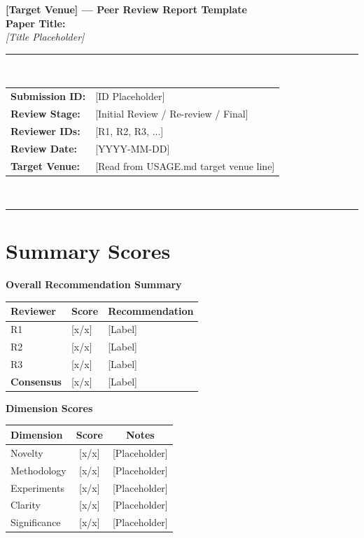 \documentclass[11pt,a4paper]{article}
\newenvironment{scorebox}[1]{%
  \begin{mdframed}[backgroundcolor=lightgray,linecolor=borderblue,linewidth=1.2pt,
                   innertopmargin=6pt,innerbottommargin=6pt,
                   innerleftmargin=10pt,innerrightmargin=10pt]
  \textbf{\color{sectionblue}#1}\\[4pt]
}{%
  \end{mdframed}
}
\begin{document}
\begin{center}
  {\LARGE\bfseries [Target Venue] --- Peer Review Report Template}\\[6pt]
  {\large\bfseries Paper Title:}\\[3pt]
  {\large\itshape [Title Placeholder]}\\[10pt]
  \rule{\linewidth}{1pt}\\[4pt]
  \begin{tabular}{ll}
    \textbf{Submission ID:}     & [ID Placeholder] \\
    \textbf{Review Stage:}      & [Initial Review / Re-review / Final] \\
    \textbf{Reviewer IDs:}      & [R1, R2, R3, ...] \\
    \textbf{Review Date:}       & [YYYY-MM-DD] \\
    \textbf{Target Venue:}      & [Read from USAGE.md target venue line] \\
  \end{tabular}\\[4pt]
  \rule{\linewidth}{1pt}
\end{center}

\section{Summary Scores}

\begin{scorebox}{Overall Recommendation Summary}
\begin{tabular}{lll}
\toprule
\textbf{Reviewer} & \textbf{Score} & \textbf{Recommendation} \\
\midrule
R1 & [x/x] & [Label] \\
R2 & [x/x] & [Label] \\
R3 & [x/x] & [Label] \\
\midrule
\textbf{Consensus} & [x/x] & [Label] \\
\bottomrule
\end{tabular}
\end{scorebox}

\begin{scorebox}{Dimension Scores}
\begin{tabular}{lcc}
\toprule
\textbf{Dimension} & \textbf{Score} & \textbf{Notes} \\
\midrule
Novelty         & [x/x] & [Placeholder] \\
Methodology     & [x/x] & [Placeholder] \\
Experiments     & [x/x] & [Placeholder] \\
Clarity          & [x/x] & [Placeholder] \\
Significance    & [x/x] & [Placeholder] \\
\bottomrule
\end{tabular}
\end{scorebox}
\end{document}
